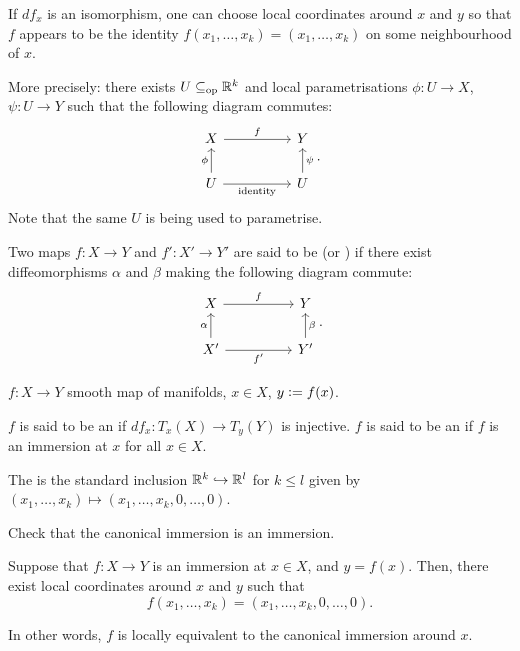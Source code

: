 \begin{rem}
	If $df_{x}$ is an isomorphism, one can choose local coordinates around $x$ and $y$ so that $f$ appears to be the identity $f(x_{1}, \ldots, x_{k}) = (x_{1}, \ldots, x_{k})$ on some neighbourhood of $x$.

	More precisely: there exists $U \subseteq_{\operatorname{op}} \mathbb{R}^{k}$ and local parametrisations $\phi : U \to X$, $\psi : U \to Y$ such that the following diagram commutes:
	\begin{equation*} 
		\begin{tikzcd}
			X \arrow[rr, "f"] & & Y \\
			U \arrow[u, "\phi"] \arrow[rr, "\text{identity}"'] & & U \arrow[u, "\psi"']
		\end{tikzcd}.
	\end{equation*}
	Note that the same $U$ is being used to parametrise.
\end{rem}

\begin{defn}
	Two maps $f : X \to Y$ and $f' : X' \to Y'$ are said to be  (or ) if there exist diffeomorphisms $\alpha$ and $\beta$ making the following diagram commute:
	\begin{equation*}  
		\begin{tikzcd}
			X \arrow[rr, "f"] & & Y \\
			X' \arrow[u, "\alpha"] \arrow[rr, "f'"'] & & Y' \arrow[u, "\beta"']
		\end{tikzcd}.		
	\end{equation*}
\end{defn}

\begin{defn} \label{defn:immersions}
	$f : X \to Y$ smooth map of manifolds, $x \in X$, $y \vcentcolon= f(x)$.

	$f$ is said to be an  if $df_{x} : T_{x}(X) \to T_{y}(Y)$ is injective. \newline
	$f$ is said to be an  if $f$ is an immersion at $x$ for all $x \in X$. 

	The  is the standard inclusion $\mathbb{R}^{k} \hookrightarrow \mathbb{R}^{l}$ for $k \le l$ given by $(x_{1}, \ldots, x_{k}) \mapsto (x_{1}, \ldots, x_{k}, 0, \ldots, 0)$.
\end{defn}

Check that the canonical immersion is an immersion.

\begin{thm}
	Suppose that $f : X \to Y$ is an immersion at $x \in X$, and $y = f(x)$. Then, there exist local coordinates around $x$ and $y$ such that
	\begin{equation*} 
		f(x_{1}, \ldots, x_{k}) = (x_{1}, \ldots, x_{k}, 0, \ldots, 0).
	\end{equation*}

	In other words, $f$ is locally equivalent to the canonical immersion around $x$.
\end{thm}

